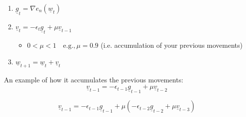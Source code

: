     \begin{definition}
        \begin{enumerate}
            \item $\underline{g}_t = \nabla e_n(\underline{w}_t)$
            \item $\underline{v}_t = -\epsilon_t \underline{g}_t + \mu \underline{v}_{t-1}$
            \begin{itemize}
                \item $0 < \mu < 1 \quad \text{e.g.,} \, \mu = 0.9$ (i.e. accumulation of your previous movements)
            \end{itemize}
            \item $\underline{w}_{t+1} = \underline{w}_t + \underline{v}_t$
        \end{enumerate}
    \end{definition}

    \begin{example}
        An example of how it accumulates the previous movements:
        \[
        \underline{v}_{t-1} = -\epsilon_{t-1} \underline{g}_{t-1} + \mu \underline{v}_{t-2}
        \]

        \[
        \underline{v}_{t-1} = -\epsilon_{t-1} \underline{g}_{t-1} + \mu \left( -\epsilon_{t-2} \underline{g}_{t-2} + \mu \underline{v}_{t-3} \right)
        \]
    \end{example}

    \begin{example}
    \end{example}

